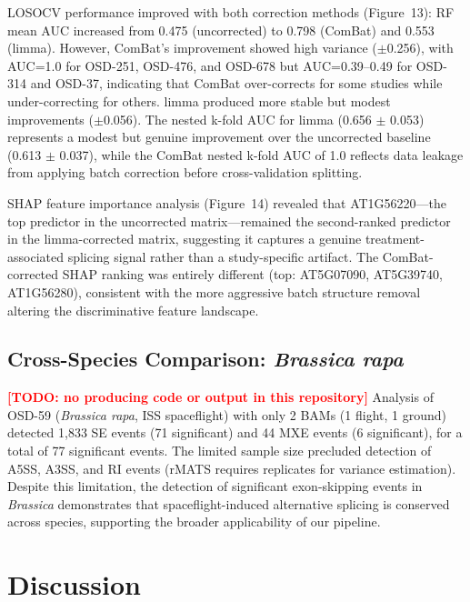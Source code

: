 \documentclass[12pt,a4paper]{article}
\newcommand{\TODO}[1]{\textcolor{red}{\textbf{[TODO: #1]}}}
\begin{document}
LOSOCV performance improved with both correction methods (Figure~13): RF mean AUC increased from 0.475 (uncorrected) to 0.798 (ComBat) and 0.553 (limma). However, ComBat's improvement showed high variance ($\pm$0.256), with AUC=1.0 for OSD-251, OSD-476, and OSD-678 but AUC=0.39--0.49 for OSD-314 and OSD-37, indicating that ComBat over-corrects for some studies while under-correcting for others. limma produced more stable but modest improvements ($\pm$0.056). The nested k-fold AUC for limma (0.656 $\pm$ 0.053) represents a modest but genuine improvement over the uncorrected baseline (0.613 $\pm$ 0.037), while the ComBat nested k-fold AUC of 1.0 reflects data leakage from applying batch correction before cross-validation splitting.

SHAP feature importance analysis (Figure~14) revealed that AT1G56220---the top predictor in the uncorrected matrix---remained the second-ranked predictor in the limma-corrected matrix, suggesting it captures a genuine treatment-associated splicing signal rather than a study-specific artifact. The ComBat-corrected SHAP ranking was entirely different (top: AT5G07090, AT5G39740, AT1G56280), consistent with the more aggressive batch structure removal altering the discriminative feature landscape.

\subsection{Cross-Species Comparison: \textit{Brassica rapa}}

\TODO{no producing code or output in this repository} Analysis of OSD-59 (\textit{Brassica rapa}, ISS spaceflight) with only 2 BAMs (1 flight, 1 ground) detected 1,833 SE events (71 significant) and 44 MXE events (6 significant), for a total of 77 significant events. The limited sample size precluded detection of A5SS, A3SS, and RI events (rMATS requires replicates for variance estimation). Despite this limitation, the detection of significant exon-skipping events in \textit{Brassica} demonstrates that spaceflight-induced alternative splicing is conserved across species, supporting the broader applicability of our pipeline.

\section{Discussion}
\end{document}
